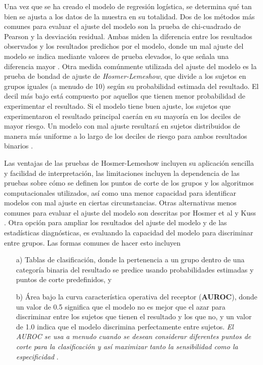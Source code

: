 \documentclass[12pt]{article}
\begin{document}
Una vez que se ha creado el modelo de regresi\'on log\'istica, se determina qu\'e tan bien se ajusta a los datos de la muestra en su totalidad. Dos de los m\'etodos m\'as comunes para evaluar el ajuste del modelo son la prueba de chi-cuadrado de Pearson y la desviaci\'on residual. Ambas miden la diferencia entre los resultados observados y los resultados predichos por el modelo, donde un mal ajuste del modelo se indica mediante valores de prueba elevados, lo que se\~nala una diferencia mayor \cite{hosmer2000, hosmer1997, kuss2002}. Otra medida com\'unmente utilizada del ajuste del modelo es la prueba de bondad de ajuste de \textit{Hosmer-Lemeshow}, que divide a los sujetos en grupos iguales (a menudo de 10) seg\'un su probabilidad estimada del resultado. El decil m\'as bajo est\'a compuesto por aquellos que tienen menor probabilidad de experimentar el resultado. Si el modelo tiene buen ajuste, los sujetos que experimentaron el resultado principal caer\'an en su mayor\'ia en los deciles de mayor riesgo. Un modelo con mal ajuste resultar\'a en sujetos distribuidos de manera m\'as uniforme a lo largo de los deciles de riesgo para ambos resultados binarios \cite{tabachnick2007, hosmer2000}.\medskip

Las ventajas de las pruebas de Hosmer-Lemeshow incluyen su aplicaci\'on sencilla y facilidad de interpretaci\'on, las limitaciones incluyen la dependencia de las pruebas sobre c\'omo se definen los puntos de corte de los grupos y los algoritmos computacionales utilizados, as\'i como una menor capacidad para identificar modelos con mal ajuste en ciertas circunstancias.  Otras alternativas menos comunes para evaluar el ajuste del modelo son descritas por Hosmer et al \cite{hosmer1997} y Kuss \cite{kuss2002}. Otra opci\'on para ampliar los resultados del ajuste del modelo y de las estad\'isticas diagn\'osticas, es evaluando la capacidad del modelo para discriminar entre grupos. Las formas comunes de hacer esto incluyen 

\begin{itemize}
\item[a) ]  Tablas de clasificaci\'on, donde la pertenencia a un grupo dentro de una categor\'ia binaria del resultado se predice usando probabilidades estimadas y puntos de corte predefinidos, y 
\item[b) ]  \'Area bajo la curva caracter\'istica operativa del receptor (\textbf{AUROC}), donde un valor de 0.5 significa que el modelo no es mejor que el azar para discriminar entre los sujetos que tienen el resultado y los que no, y un valor de 1.0 indica que el modelo discrimina perfectamente entre sujetos. \textit{El AUROC se usa a menudo cuando se desean considerar diferentes puntos de corte para la clasificaci\'on y as\'i maximizar tanto la sensibilidad como la especificidad} \cite{zou2007}.
\end{itemize}
\end{document}
